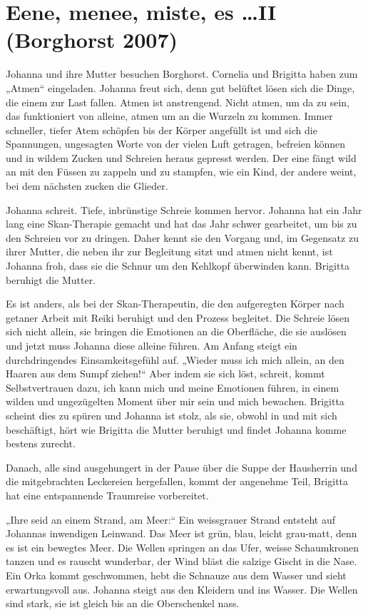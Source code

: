 \documentclass[10pt,titlepage,a5paper]{book}
\begin{document}
\section*{Eene, menee, miste, es \dots  II (Borghorst 2007)}




Johanna und ihre Mutter besuchen Borghorst. Cornelia und Brigitta haben zum „Atmen“ eingeladen. Johanna freut sich, denn gut belüftet lösen sich die Dinge, die einem zur Last fallen. Atmen ist anstrengend. Nicht atmen, um da zu sein, das funktioniert von alleine, atmen um an die Wurzeln zu kommen. Immer schneller, tiefer Atem schöpfen bis der Körper angefüllt ist und sich die Spannungen, ungesagten Worte von der vielen Luft getragen, befreien können und in wildem Zucken und Schreien heraus gepresst werden. Der eine fängt wild an mit den Füssen zu zappeln und zu stampfen, wie ein Kind, der andere weint, bei dem nächsten zucken die Glieder. 

Johanna schreit. Tiefe, inbrünstige Schreie kommen hervor. Johanna hat ein Jahr lang eine Skan-Therapie gemacht und hat das Jahr schwer gearbeitet, um bis zu den Schreien vor zu dringen. Daher kennt sie den Vorgang und, im Gegensatz zu ihrer Mutter, die neben ihr zur Begleitung sitzt und atmen nicht kennt, ist Johanna froh, dass sie die Schnur um den Kehlkopf überwinden kann. Brigitta beruhigt die Mutter. 

Es ist anders, als bei der Skan-Therapeutin, die den aufgeregten Körper nach getaner Arbeit mit Reiki  beruhigt und den Prozess begleitet. Die Schreie lösen sich nicht allein, sie bringen die Emotionen an die Oberfläche, die sie auslösen und jetzt muss Johanna diese alleine führen. Am Anfang steigt ein durchdringendes Einsamkeitsgefühl auf. „Wieder muss ich mich allein, an den Haaren aus dem Sumpf ziehen!“ Aber indem sie sich löst, schreit, kommt Selbstvertrauen dazu, ich kann mich und meine Emotionen führen, in einem wilden und ungezügelten Moment über mir sein und mich bewachen. Brigitta scheint dies zu spüren und Johanna ist stolz, als sie, obwohl in und mit sich beschäftigt, hört wie Brigitta die Mutter beruhigt und findet Johanna komme bestens zurecht.

Danach, alle sind ausgehungert in der Pause über die Suppe der Hausherrin und die mitgebrachten Leckereien hergefallen, kommt der angenehme Teil, Brigitta hat eine entspannende Traumreise vorbereitet. 

„Ihre seid an einem Strand, am Meer:“ Ein weissgrauer Strand entsteht auf Johannas inwendigen Leinwand. Das Meer ist grün, blau, leicht grau-matt, denn es ist ein bewegtes Meer. Die Wellen springen an das Ufer, weisse Schaumkronen tanzen und es rauscht wunderbar, der Wind bläst die salzige Gischt in die Nase. Ein Orka kommt geschwommen, hebt die Schnauze aus dem Wasser und  sieht erwartungsvoll aus. Johanna steigt aus den Kleidern und ins Wasser. Die Wellen sind stark, sie ist gleich bis an die Oberschenkel nass. 
\end{document}
